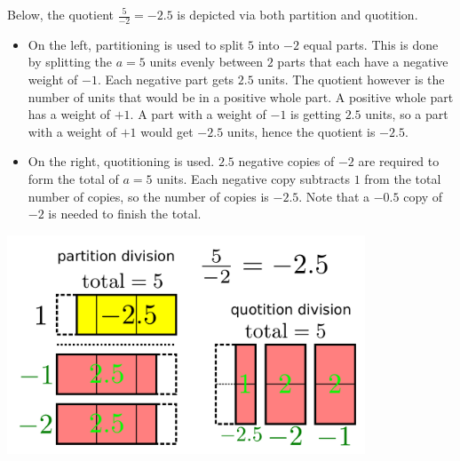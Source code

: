 \documentclass{article}
\begin{document}
Below, the quotient \(\frac{5}{-2} = -2.5\) is depicted via both partition and quotition. 
\begin{itemize}
\item On the left, partitioning is used to split \(5\) into \(-2\) equal parts. This is done by splitting the \(a = 5\) units evenly between \(2\) parts that each have a negative weight of \(-1\). Each negative part gets \(2.5\) units. The quotient however is the number of units that would be in a positive whole part. A positive whole part has a weight of \(+1\). A part with a weight of \(-1\) is getting \(2.5\) units, so a part with a weight of \(+1\) would get \(-2.5\) units, hence the quotient is \(-2.5\).
\item On the right, quotitioning is used. \(2.5\) negative copies of \(-2\) are required to form the total of \(a = 5\) units. Each negative copy subtracts \(1\) from the total number of copies, so the number of copies is \(-2.5\). Note that a \(-0.5\) copy of \(-2\) is needed to finish the total. 
\end{itemize}
\includegraphics[width = 0.8\textwidth]{5_div_m2}

\vspace{5mm}

\end{document}
